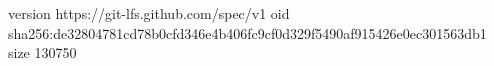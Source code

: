 version https://git-lfs.github.com/spec/v1
oid sha256:de32804781cd78b0cfd346e4b406fc9cf0d329f5490af915426e0ec301563db1
size 130750
